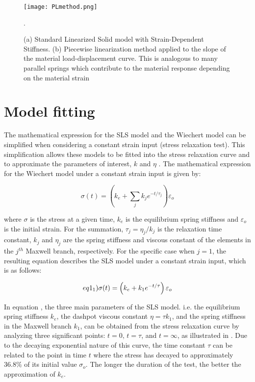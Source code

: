 \begin{figure}[htb!]
	\centering
    \texttt{[image: PLmethod.png]}
    \caption{(a) Standard Linearized Solid model with Strain-Dependent Stiffness. (b) Piecewise linearization method applied to the slope of the material load-displacement curve. This is analogous to many parallel springs which contribute to the material response depending on the material strain \cite{austin2015control}}.
    \label{fig:PLmethod}
\end{figure}

\section{Model fitting} \label{sec:Modelfit}

The mathematical expression for the SLS model and the Wiechert model can be simplified when considering a constant strain input (stress relaxation test). This simplification allows these models to be fitted into the stress relaxation curve and to approximate the parameters of interest, $k$ and $\eta$ \cite{roylance2001engineering}. The mathematical expression for the Wiechert model under a constant strain input is given by:

\begin{equation}
\label{eq1}
\sigma (t) = \left( k_e +  \sum_{j} k_j e^{-t/\tau_j} \right)  \varepsilon_o
\end{equation}

\noindent where $\sigma$ is the stress at a given time, $k_e$ is the equilibrium spring stiffness and $\varepsilon_o$ is the initial strain. For the summation, $\tau_j=\eta_j/k_j$ is the relaxation time constant, $k_j$ and $\eta_j$ are the spring stiffness and viscous constant of the elements in the $j^{th}$ Maxwell branch, respectively. For the specific case when $j = 1$, the resulting equation describes the SLS model under a constant strain input, which is as follows:

\begin{equation}
\label(eq1_1)
\sigma(t) = \left( k_e +  k_1 e^{-t/\tau} \right)  \varepsilon_o
\end{equation}


In equation , the three main parameters of the SLS model. i.e. the equilibrium spring stiffness $k_e$, the dashpot viscous constant $\eta = \tau k_1$, and the spring stiffness in the Maxwell branch $k_1$, can be obtained from the stress relaxation curve by analyzing three significant points: $t=0$, $t=\tau$, and $t=\infty$, as illustrated in . Due to the decaying exponential nature of this curve, the time constant $\tau$ can be related to the point in time $t$ where the stress has decayed to approximately 36.8\% of its initial value $\sigma_o$. The longer the duration of the test, the better the approximation of $k_e$.


